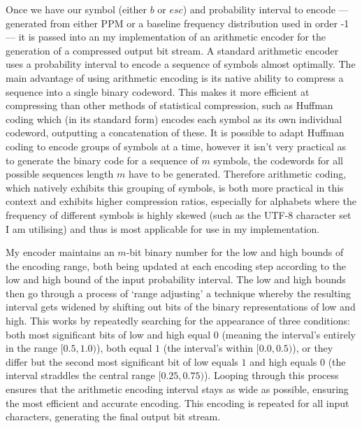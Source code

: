 \documentclass[a4paper, 11pt]{article}
\begin{document}
Once we have our symbol (either $b$ or $esc$) and probability interval to encode --- generated from either PPM or a baseline frequency distribution used in order -1 --- it is passed into an my implementation of an arithmetic encoder for the generation of a compressed output bit stream. A standard arithmetic encoder uses a probability interval to encode a sequence of symbols almost optimally. The main advantage of using arithmetic encoding is its native ability to compress a sequence into a single binary codeword. This makes it more efficient at compressing than other methods of statistical compression, such as Huffman coding which (in its standard form) encodes each symbol as its own individual codeword, outputting a concatenation of these. It is possible to adapt Huffman coding to encode groups of symbols at a time, however it isn't very practical as to generate the binary code for a sequence of $m$ symbols, the codewords for all possible sequences length $m$ have to be generated. Therefore arithmetic coding, which natively exhibits this grouping of symbols, is both more practical in this context and exhibits higher compression ratios, especially for alphabets where the frequency of different symbols is highly skewed (such as the UTF-8 character set I am utilising) and thus is most applicable for use in my implementation.

My encoder maintains an $m$-bit binary number for the low and high bounds of the encoding range, both being updated at each encoding step according to the low and high bound of the input probability interval. The low and high bounds then go through a process of `range adjusting' a technique whereby the resulting interval gets widened by shifting out bits of the binary representations of low and high. This works by repeatedly searching for the appearance of three conditions: both most significant bits of low and high equal $0$ (meaning the interval's entirely in the range $[0.5, 1.0)$), both equal $1$ (the interval’s within $[0.0, 0.5)$), or they differ but the second most significant bit of low equals $1$ and high equals $0$ (the interval straddles the central range $[0.25, 0.75)$). Looping through this process ensures that the arithmetic encoding interval stays as wide as possible, ensuring the most efficient and accurate encoding. This encoding is repeated for all input characters, generating the final output bit stream.
\end{document}
